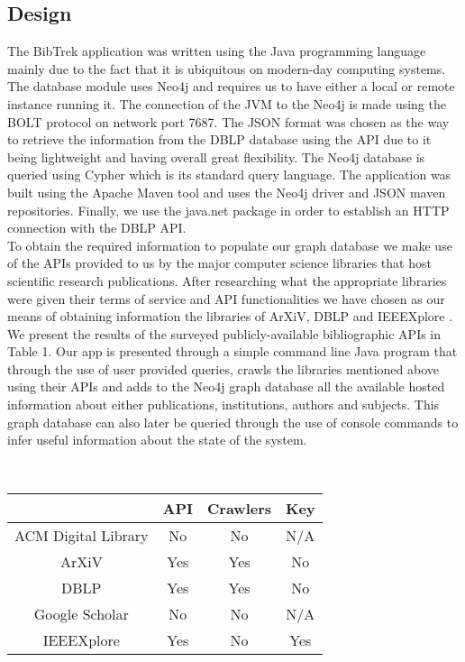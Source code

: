 \documentclass[twocolumn]{article}
\begin{document}
\subsection{Design}
The BibTrek application was written using the Java programming language mainly due to the fact that it is ubiquitous on modern-day computing systems. The database module uses Neo4j and requires us to have either a local or remote instance running it. The connection of the JVM to the Neo4j is made using the BOLT protocol on network port 7687. The JSON format was chosen as the way to retrieve the information from the DBLP database using the API due to it being lightweight and having overall great flexibility. The Neo4j database is queried using Cypher\cite{cypher} which is its standard query language. The application was built using the Apache Maven tool and uses the Neo4j driver and JSON maven repositories. Finally, we use the java.net package in order to establish an HTTP connection with the DBLP API.
\\[1\baselineskip]
To obtain the required information to populate our graph database we make use of the APIs provided to us by the major computer science libraries that host scientific research publications. After researching what the appropriate libraries were given their terms of service and API functionalities we have chosen as our means of obtaining information the libraries of ArXiV, DBLP and IEEEXplore \cite{arxiv, dblp, ieeexplore}. We present the results of the surveyed publicly-available bibliographic APIs in Table 1. Our app is presented through a simple command line Java program that through the use of user provided queries, crawls the libraries mentioned above using their APIs and adds to the Neo4j\cite{neo4j} graph database all the available hosted information about either publications, institutions, authors and subjects. This graph database can also later be queried through the use of console commands to infer useful information about the state of the system. 

\begin{table}[]
\centering
{}
\\[1\baselineskip]
\begin{tabular}{c|c|c|c|}
\cline{2-4}
\multicolumn{1}{l|}{}                     & API & Crawlers & Key \\ \hline
\multicolumn{1}{|c|}{ACM Digital Library} & No  & No       & N/A \\ \hline
\multicolumn{1}{|c|}{ArXiV}               & Yes & Yes      & No  \\ \hline
\multicolumn{1}{|c|}{DBLP}                & Yes & Yes      & No  \\ \hline
\multicolumn{1}{|c|}{Google Scholar}      & No  & No       & N/A \\ \hline
\multicolumn{1}{|c|}{IEEEXplore}          & Yes & No       & Yes \\ \hline
\end{tabular}
\end{table}
\end{document}
